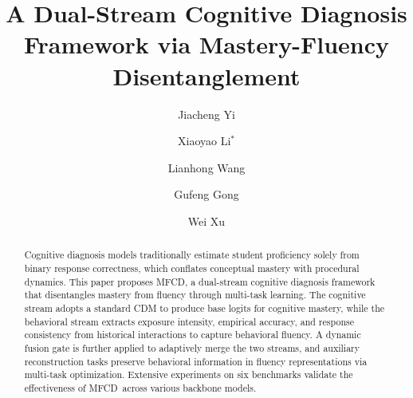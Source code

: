 \documentclass[a4paper,runningheads]{llncs}
\def\mymethod{MFCD}
\begin{document}
\title{A Dual-Stream Cognitive Diagnosis Framework via Mastery-Fluency Disentanglement}

\author{Jiacheng Yi \and
Xiaoyao Li$^{*}$ \and
Lianhong Wang \and
Gufeng Gong \and
Wei Xu}



\maketitle

\begingroup
\renewcommand{\thefootnote}{\fnsymbol{footnote}}
\endgroup

\begin{abstract}
Cognitive diagnosis models traditionally estimate student proficiency solely from binary response correctness, which conflates conceptual mastery with procedural dynamics. This paper proposes \mymethod, a dual-stream cognitive diagnosis framework that disentangles mastery from fluency through multi-task learning. The cognitive stream adopts a standard CDM to produce base logits for cognitive mastery, while the behavioral stream extracts exposure intensity, empirical accuracy, and response consistency from historical interactions to capture behavioral fluency. A dynamic fusion gate is further applied to adaptively merge the two streams, and auxiliary reconstruction tasks preserve behavioral information in fluency representations via multi-task optimization. Extensive experiments on six benchmarks validate the effectiveness of \mymethod\ across various backbone models.

\end{abstract}

\end{document}
